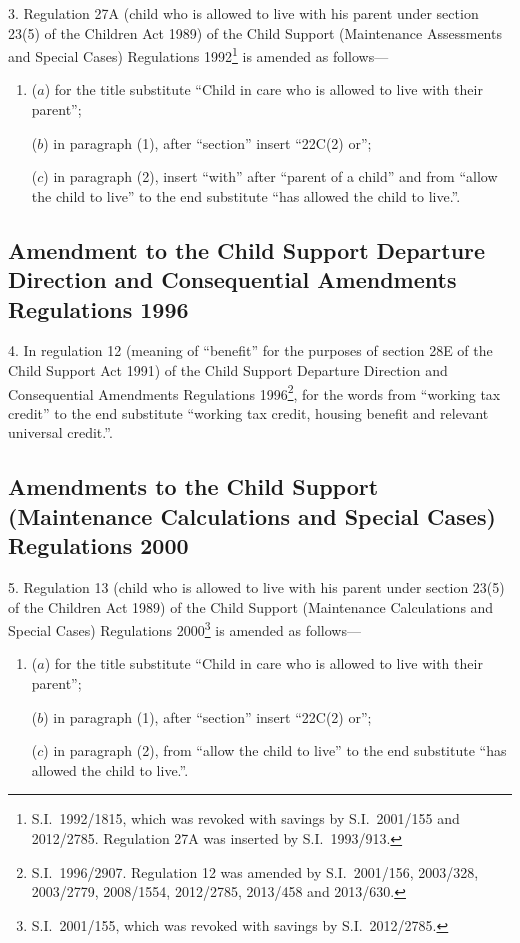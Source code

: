 \documentclass[12pt,a4paper]{article}
\begin{document}
3.  Regulation 27A (child who is allowed to live with his parent under section 23(5) of the Children Act 1989) of the Child Support (Maintenance Assessments and Special Cases) Regulations 1992\footnote{S.I.~1992/1815, which was revoked with savings by S.I.~2001/155 and 2012/2785. Regulation 27A was inserted by S.I.~1993/913.} is amended as follows—
\begin{enumerate}\item[]
($a$) for the title substitute “Child in care who is allowed to live with their parent”;

($b$) in paragraph (1), after “section” insert “22C(2) or”;

($c$) in paragraph (2), insert “with” after “parent of a child” and from “allow the child to live” to the end substitute “has allowed the child to live.”.
\end{enumerate}

\subsection[4. Amendment to the Child Support Departure Direction and Consequential Amendments Regulations 1996]{Amendment to the Child Support Departure Direction and Consequential Amendments Regulations 1996}

4.  In regulation 12 (meaning of “benefit” for the purposes of section 28E of the Child Support Act 1991) of the Child Support Departure Direction and Consequential Amendments Regulations 1996\footnote{S.I.~1996/2907. Regulation 12 was amended by S.I.~2001/156, 2003/328, 2003/2779, 2008/1554, 2012/2785, 2013/458 and 2013/630.}, for the words from “working tax credit” to the end substitute “working tax credit, housing benefit and relevant universal credit.”.

\subsection[5. Amendments to the Child Support (Maintenance Calculations and Special Cases) Regulations 2000]{Amendments to the Child Support (Maintenance Calculations and Special Cases) Regulations 2000}

5.  Regulation 13 (child who is allowed to live with his parent under section 23(5) of the Children Act 1989) of the Child Support (Maintenance Calculations and Special Cases) Regulations 2000\footnote{S.I.~2001/155, which was revoked with savings by S.I.~2012/2785.} is amended as follows—
\begin{enumerate}\item[]
($a$) for the title substitute “Child in care who is allowed to live with their parent”;

($b$) in paragraph (1), after “section” insert “22C(2) or”;

($c$) in paragraph (2), from “allow the child to live” to the end substitute “has allowed the child to live.”.
\end{enumerate}
\end{document}
